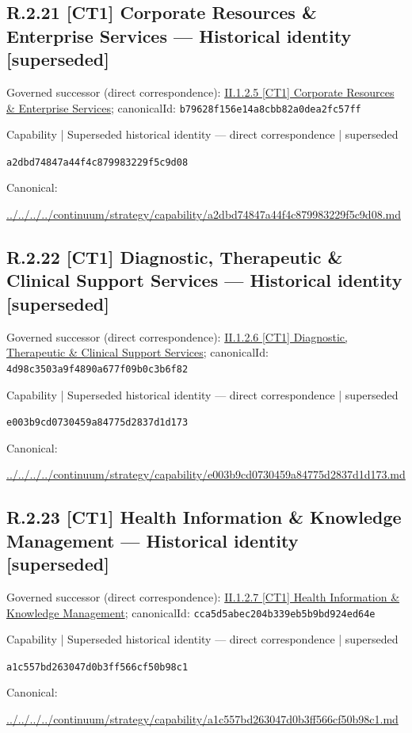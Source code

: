 \documentclass[10pt,a4paper]{article}
\begin{document}
\subsection*{R.2.21 [CT1] Corporate Resources \& Enterprise Services — Historical identity [superseded]}
Governed successor (direct correspondence): \hyperref[element-b79628f156e14a8cbb82a0dea2fc57ff]{II.1.2.5 [CT1] Corporate Resources \& Enterprise Services}; canonicalId: \texttt{b79628f156e14a8cbb82a0dea2fc57ff}\par
\label{element-a2dbd74847a44f4c879983229f5c9d08}
{\small Capability | Superseded historical identity — direct correspondence | superseded}\par
\texttt{a2dbd74847a44f4c879983229f5c9d08}\par
Canonical: \par
{\footnotesize\url{../../../../continuum/strategy/capability/a2dbd74847a44f4c879983229f5c9d08.md}}\par
\subsection*{R.2.22 [CT1] Diagnostic, Therapeutic \& Clinical Support Services — Historical identity [superseded]}
Governed successor (direct correspondence): \hyperref[element-4d98c3503a9f4890a677f09b0c3b6f82]{II.1.2.6 [CT1] Diagnostic, Therapeutic \& Clinical Support Services}; canonicalId: \texttt{4d98c3503a9f4890a677f09b0c3b6f82}\par
\label{element-e003b9cd0730459a84775d2837d1d173}
{\small Capability | Superseded historical identity — direct correspondence | superseded}\par
\texttt{e003b9cd0730459a84775d2837d1d173}\par
Canonical: \par
{\footnotesize\url{../../../../continuum/strategy/capability/e003b9cd0730459a84775d2837d1d173.md}}\par
\subsection*{R.2.23 [CT1] Health Information \& Knowledge Management — Historical identity [superseded]}
Governed successor (direct correspondence): \hyperref[element-cca5d5abec204b339eb5b9bd924ed64e]{II.1.2.7 [CT1] Health Information \& Knowledge Management}; canonicalId: \texttt{cca5d5abec204b339eb5b9bd924ed64e}\par
\label{element-a1c557bd263047d0b3ff566cf50b98c1}
{\small Capability | Superseded historical identity — direct correspondence | superseded}\par
\texttt{a1c557bd263047d0b3ff566cf50b98c1}\par
Canonical: \par
{\footnotesize\url{../../../../continuum/strategy/capability/a1c557bd263047d0b3ff566cf50b98c1.md}}\par
\end{document}
